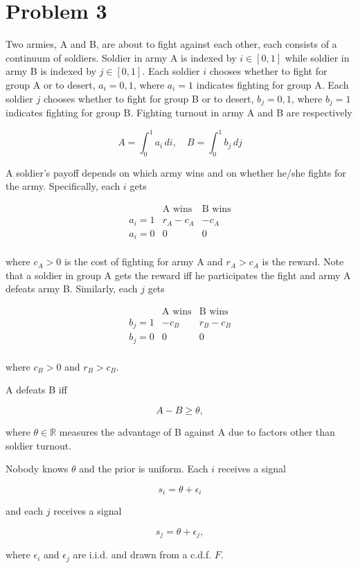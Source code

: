 \documentclass[11pt]{article}
\begin{document}
\section*{Problem 3}
\begin{problem}

Two armies, A and B, are about to fight against each other, each consists of a continuum of soldiers. Soldier in army A is indexed by \( i \in [0, 1] \) while soldier in army B is indexed by \( j \in [0, 1] \). Each soldier \( i \) chooses whether to fight for group A or to desert, \( a_i = 0,1 \), where \( a_i = 1 \) indicates fighting for group A. Each soldier \( j \) chooses whether to fight for group B or to desert, \( b_j = 0, 1 \), where \( b_j = 1 \) indicates fighting for group B. Fighting turnout in army A and B are respectively

\[
A = \int_0^1 a_i \, di, \quad B = \int_0^1 b_j \, dj
\]

A soldier's payoff depends on which army wins and on whether he/she fights for the army. Specifically, each \( i \) gets

\[
\begin{array}{c|c|c}
 & \text{A wins} & \text{B wins} \\
\hline
a_i = 1 & r_A - c_A & -c_A \\
a_i = 0 & 0 & 0 \\
\end{array}
\]

where \( c_A > 0 \) is the cost of fighting for army A and \( r_A > c_A \) is the reward. Note that a soldier in group A gets the reward iff he participates the fight and army A defeats army B. Similarly, each \( j \) gets

\[
\begin{array}{c|c|c}
 & \text{A wins} & \text{B wins} \\
\hline
b_j = 1 & -c_B & r_B - c_B \\
b_j = 0 & 0 & 0 \\
\end{array}
\]

where \( c_B > 0 \) and \( r_B > c_B \).

A defeats B iff

\[
A - B \geq \theta,
\]

where \( \theta \in \mathbb{R} \) measures the advantage of B against A due to factors other than soldier turnout.

Nobody knows \( \theta \) and the prior is uniform. Each \( i \) receives a signal

\[
s_i = \theta + \epsilon_i
\]

and each \( j \) receives a signal

\[
s_j = \theta + \epsilon_j,
\]

where \( \epsilon_i \) and \( \epsilon_j \) are i.i.d. and drawn from a c.d.f. \( F \).
\end{problem}
\end{document}
